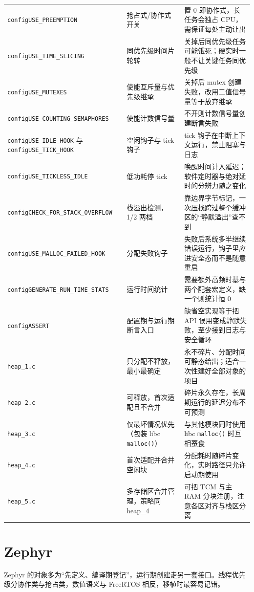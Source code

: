 \documentclass[12pt,a4paper,fontset=fandol]{ctexbook}
\newcommand{\Fn}[1]{\texttt{#1()}}
\newcommand{\Tp}[1]{\texttt{#1}}
\newcommand{\Bk}{\discretionary{}{}{}}
\begin{document}
\begin{longtable}{>{\raggedright\arraybackslash\footnotesize}p{} >{\raggedright\arraybackslash\footnotesize}p{} >{\raggedright\arraybackslash\footnotesize}p{}}
\Tp{configUSE\_PREEMPTION} & 抢占式/协作式开关 & 置 0 即协作式，长任务会独占 CPU，需保证每处主动让出 \\
\Tp{configUSE\_TIME\_SLICING} & 同优先级时间片轮转 & 关掉后同优先级任务可能饿死；硬实时一般不让关键任务同优先级 \\
\Tp{configUSE\_MUTEXES} & 使能互斥量与优先级继承 & 关掉后 mutex 创建失败，改用二值信号量等于放弃继承 \\
\Tp{configUSE\_{\Bk}COUNTING\_{\Bk}SEMAPHORES} & 使能计数信号量 & 不开则计数信号量创建断言失败 \\
\Tp{configUSE\_IDLE\_HOOK} 与 \Tp{configUSE\_TICK\_HOOK} & 空闲钩子与 tick 钩子 & tick 钩子在中断上下文运行，禁止阻塞与日志 \\
\Tp{configUSE\_TICKLESS\_IDLE} & 低功耗停 tick & 唤醒时间计入延迟；软件定时器与绝对延时的分辨力随之变化 \\
\Tp{configCHECK\_{\Bk}FOR\_{\Bk}STACK\_{\Bk}OVERFLOW} & 栈溢出检测，1/2 两档 & 靠边界字节标记，一次压栈跨过整个缓冲区的``静默溢出''查不到 \\
\Tp{configUSE\_{\Bk}MALLOC\_{\Bk}FAILED\_{\Bk}HOOK} & 分配失败钩子 & 失败后系统多半继续错误运行，钩子里应进安全态而不是随意重启 \\
\Tp{configGENERATE\_{\Bk}RUN\_{\Bk}TIME\_{\Bk}STATS} & 运行时间统计 & 需要额外高频时基与两个配套宏定义，缺一个则统计恒 0 \\
\Tp{configASSERT} & 配置期与运行期断言入口 & 缺省空实现等于把 API 误用变成静默失败，至少接到日志与安全循环 \\
\Tp{heap\_1.c} & 只分配不释放，最小最确定 & 永不碎片、分配时间可静态给出；适合一次性建好全部对象的项目 \\
\Tp{heap\_2.c} & 可释放，首次适配且不合并 & 碎片永久存在，长周期运行的延迟分布不可预测 \\
\Tp{heap\_3.c} & 仅最坏情况优先（包装 libc \Fn{malloc}） & 与其他模块同时使用 libc \Fn{malloc} 时互相蚕食 \\
\Tp{heap\_4.c} & 首次适配并合并空闲块 & 分配耗时随碎片变化，实时路径只允许启动期使用 \\
\Tp{heap\_5.c} & 多存储区合并管理，策略同 heap\_4 & 可把 TCM 与主 RAM 分块注册，注意各区对齐与栈区分离 \\
\end{longtable}

\section{Zephyr}

Zephyr 的对象多为``先定义、编译期登记''，运行期创建走另一套接口。线程优先级分协作类与抢占类，数值语义与 FreeRTOS 相反，移植时最容易记错。
\end{document}
